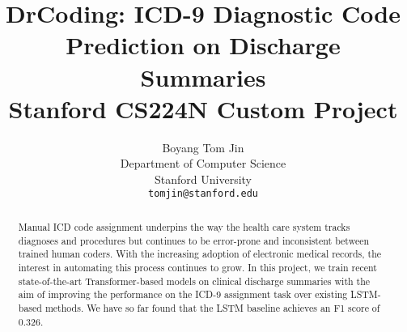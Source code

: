 \documentclass{article}
\title{
  DrCoding: ICD-9 Diagnostic Code Prediction on Discharge Summaries \\
  \vspace{1em}
  \small{\normalfont Stanford CS224N Custom Project}  %
}
\author{
  Boyang Tom Jin \\
  Department of Computer Science \\
  Stanford University \\
  \texttt{tomjin@stanford.edu} \\
}
\begin{document}
\maketitle

\begin{abstract}
	Manual ICD code assignment underpins the way the health care system tracks diagnoses and procedures but continues to be error-prone and inconsistent between trained human coders. With the increasing adoption of electronic medical records, the interest in automating this process continues to grow. In this project, we train recent state-of-the-art Transformer-based models on clinical discharge summaries with the aim of improving the performance on the ICD-9 assignment task over existing LSTM-based methods. We have so far found that the LSTM baseline achieves an F1 score of 0.326.
\end{abstract}
\end{document}
